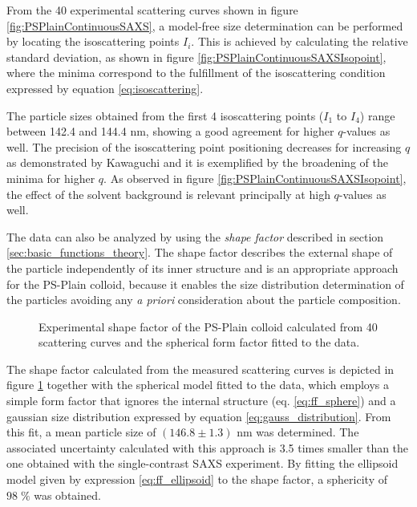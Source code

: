 From the 40 experimental scattering curves shown in figure \ref{fig:PSPlainContinuousSAXS}, a model-free size determination can be performed by locating the isoscattering points $I_i$. This is achieved by calculating the relative standard deviation, as shown in figure \ref{fig:PSPlainContinuousSAXSIsopoint}, where the minima correspond to the fulfillment of the isoscattering condition expressed by equation \ref{eq:isoscattering}.

The particle sizes obtained from the first 4 isoscattering points ($I_1$ to $I_4$) range between 142.4 and 144.4 nm, showing a good agreement for higher $q$-values as well. The precision of the isoscattering point positioning decreases for increasing $q$ as demonstrated by Kawaguchi\citep{kawaguchi_isoscattering_1992} and it is exemplified by the broadening of the minima for higher $q$. As observed in figure \ref{fig:PSPlainContinuousSAXSIsopoint}, the effect of the solvent background is relevant principally at high $q$-values as well.

The data can also be analyzed by using the \emph{shape factor} described in section \ref{sec:basic_functions_theory}. The shape factor describes the external shape of the particle independently of its inner structure and is an appropriate approach for the PS-Plain colloid, because it enables the size distribution determination of the particles avoiding any \emph{a priori} consideration about the particle composition.

\begin{figure}
	\begin{center}
		
	\end{center}
	\caption{Experimental shape factor of the PS-Plain colloid calculated from 40 scattering curves and the spherical form factor fitted to the data.}
	\label{fig:PSPlainResonantTerm}
\end{figure}

The shape factor calculated from the measured scattering curves is depicted in figure \ref{fig:PSPlainResonantTerm} together with the spherical model fitted to the data, which employs a simple form factor that ignores the internal structure (eq. \ref{eq:ff_sphere}) and a gaussian size distribution expressed by equation \ref{eq:gauss_distribution}. From this fit, a mean particle size of $(146.8\pm1.3)$ nm was determined. The associated uncertainty calculated with this approach is 3.5 times smaller than the one obtained with the single-contrast SAXS experiment. By fitting the ellipsoid model given by expression \ref{eq:ff_ellipsoid} to the shape factor, a sphericity of $98\;\%$ was obtained.

